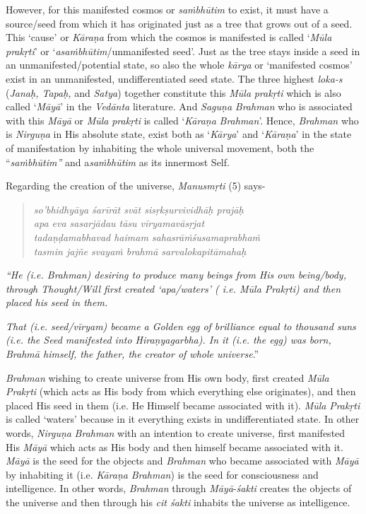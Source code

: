 However, for this manifested cosmos or \emph{saṁbhūtim} to exist, it must have a source/seed from which it has originated just as a tree that grows out of a seed. This `cause' or \emph{Kāraṇa} from which the cosmos is manifested is called `\emph{Mūla} \emph{prakṛti}' or `\emph{asaṁbhūtim}/unmanifested seed'. Just as the tree stays inside a seed in an unmanifested/potential state, so also the whole \emph{kārya} or `manifested cosmos' exist in an unmanifested, undifferentiated seed state. The three highest \emph{loka-s} (\emph{Janaḥ, Tapaḥ,} and \emph{Satya}) together constitute this \emph{Mūla} \emph{prakṛti} which is also called `\emph{Māyā}' in the \emph{Vedānta} literature. And \emph{Saguṇa} \emph{Brahman} who is associated with this \emph{Māyā} or \emph{Mūla} \emph{prakṛti} is called `\emph{Kāraṇa} \emph{Brahman}'. Hence, \emph{Brahman} who is \emph{Nirguṇa} in His absolute state, exist both as `\emph{Kārya}' and `\emph{Kāraṇa}' in the state of manifestation by inhabiting the whole universal movement, both the ``\emph{saṁbhūtim''} and a\emph{saṁbhūtim} as its innermost Self.

Regarding the creation of the universe, \emph{Manusmṛti} (5) says-
\vskip -10pt

\begin{verse}
\emph{so'bhidhyāya śarīrāt svāt sisṛkṣurvividhāḥ prajāḥ }\\
\emph{apa eva sasarjādau tāsu vīryamavāsṛjat }\\
\emph{tadaṇḍamabhavad haimam sahasrāṁśusamaprabhaṁ }\\
\emph{tasmin jajñe svayaṁ brahmā sarvalokapitāmahaḥ }
\end{verse}
\vskip -10pt

\emph{``He (i.e. Brahman) desiring to produce many beings from His own being/body, through Thought/Will first created `apa/waters' ( i.e. Mūla Prakṛti) and then placed his seed in them.}

\emph{That (i.e. seed/vīryam) became a Golden egg of brilliance equal to thousand suns (i.e. the Seed manifested into Hiraṇyagarbha). In it (i.e. the egg) was born, Brahmā himself, the father, the creator of whole universe}.''

\emph{Brahman} wishing to create universe from His own body, first created \emph{Mūla Prakṛti} (which acts as His body from which everything else originates), and then placed His seed in them (i.e. He Himself became associated with it). \emph{Mūla} \emph{Prakṛti} is called `waters' because in it everything exists in undifferentiated state. In other words, \emph{Nirguṇa} \emph{Brahman} with an intention to create universe, first manifested His \emph{Māyā} which acts as His body and then himself became associated with it. \emph{Māyā} is the seed for the objects and \emph{Brahman} who became associated with \emph{Māyā} by inhabiting it (i.e. \emph{Kāraṇa} \emph{Brahman}) is the seed for consciousness and intelligence. In other words, \emph{Brahman} through \emph{Māyā}-\emph{śakti} creates the objects of the universe and then through his \emph{cit śakti} inhabits the universe as intelligence.

